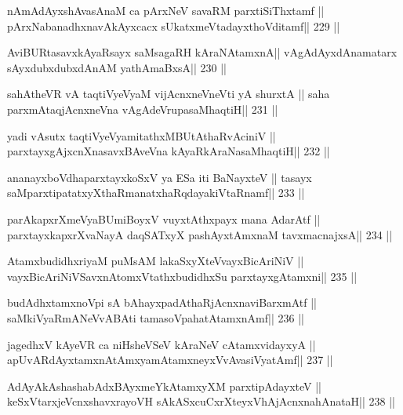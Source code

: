 \begin{shl}
nAmAdAyxshAvasAnaM ca pArxNeV savaRM parxtiSiThxtamf ||
pArxNabanadhxnavAkAyxcacx sUkatxmeVtadayxthoVditamf\hfill || 229 ||
\end{shl}

\begin{shl}
AviBURtasavxkAyaRsayx saMsagaRH kAraNAtamxnA||
vAgAdAyxdAnamatarx sAyxdubxdubxdAnAM yathA\s maBxsA\hfill || 230 ||
\end{shl}

\begin{shl}
sahAtheVR vA taqtiVyeVyaM vijAcnxneVneVti yA shurxtA ||
saha parxmAtaqjAcnxneVna vAgAdeVrupasaMhaqtiH\hfill || 231 ||
\end{shl}

\begin{shl}
yadi vA\s sutx taqtiVyeVyamitathxMBUtAthaRvAciniV ||
parxtayxgAjxcnXnasavxBAveVna kAyaRkAraNasaMhaqtiH\hfill || 232 ||
\end{shl}

\begin{shl}
ananayxboVdhaparxtayxkoSxV ya ESa iti BaNayxteV ||
tasayx saMparxtipatatxyXthaRmanatxhaRqdayakiVtaRnamf\hfill || 233 ||
\end{shl}

\begin{shl}
parAkapxrXmeVyaBUmiBoyxV vuyxtAthxpayx mana AdarAtf ||
parxtayxkapxrXvaNayA daqSATxyX pashAyx\s\s tAmxnaM tavxmacnajxsA\hfill || 234 ||
\end{shl}

\begin{shl}
AtamxbudidhxriyaM puMsAM lakaSxyXteV\s vayxBicAriNiV ||
vayxBicAriNiVSavxnAtomxVtathxbudidhxSu parxtayxgAtamxni\hfill || 235 ||
\end{shl}

\begin{shl}
budAdhxtamxnoV\s pi sA bAhayxpadAthaRjAcnxnaviBarxmAtf ||
saMkiVyaRmANeVvA\s\s BAti tamasoVpahatAtamxnAmf\hfill || 236 ||
\end{shl}

\begin{shl}
jagedhxV kAyeVR ca niHsheVSeV kAraNeV cA\s\s tamxvidayxyA ||
apUvARdAyxtamxnA\s\s tAmx\s yamAtamxneyxVvAvasiVyatAmf\hfill || 237 ||
\end{shl}

\begin{shl}
AdAyAkAshashabAdxBAyxmeYkAtamxyXM parxtipAdayxteV ||
keSxVtarxjeVcnxshavxrayoVH sAkASxcuCxrXteyxVhAjAcnxnahAnataH\hfill || 238 ||
\end{shl}

